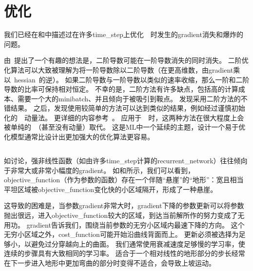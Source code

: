 \section{优化}
\label{sec:optimization_for_long_term_dependencies}
我们已经在和中描述过在许多\gls{time_step}上优化~~时发生的\gls{gradient}消失和爆炸的问题。

由~\cite{Martens+Sutskever-ICML2011}提出了一个有趣的想法是，二阶导数可能在一阶导数消失的同时消失。
二阶优化算法可以大致被理解为将一阶导数除以二阶导数（在更高维数，由\gls{gradient}乘以~\gls{hessian}~的逆）。
如果二阶导数与一阶导数以类似的速率收缩，那么一阶和二阶导数的比率可保持相对恒定。
不幸的是，二阶方法有许多缺点，包括高的计算成本、需要一个大的\gls{minibatch}、并且倾向于被吸引到鞍点。
\cite{Martens+Sutskever-ICML2011}发现采用二阶方法的不错结果。
之后，\cite{sutskeverimportance}发现使用较简单的方法可以达到类似的结果，例如经过谨慎初始化的~~动量法。
更详细的内容参考~\cite{Sutskever-thesis2012}。
应用于~~时，这两种方法在很大程度上会被单纯的~（甚至没有动量）取代。
这是\gls{ML}中一个延续的主题，设计一个易于优化模型通常比设计出更加强大的优化算法更容易。


\subsection{}
\label{sec:clipping_gradients}
如讨论，强非线性函数（如由许多\gls{time_step}计算的\gls{recurrent_network}）往往倾向于非常大或非常小幅度的\gls{gradient}。
如和所示，我们可以看到，\gls{objective_function}（作为参数的函数）存在一个伴随``悬崖''的``地形''：宽且相当平坦区域被\gls{objective_function}变化快的小区域隔开，形成了一种悬崖。

这导致的困难是，当参数\gls{gradient}非常大时，\gls{gradient}下降的参数更新可以将参数抛出很远，进入\gls{objective_function}较大的区域，到达当前解所作的努力变成了无用功。
\gls{gradient}告诉我们，围绕当前参数的无穷小区域内最速下降的方向。
这个无穷小区域之外，\gls{cost_function}可能开始沿曲线背面而上。
更新必须被选择为足够小，以避免过分穿越向上的曲面。
我们通常使用衰减速度足够慢的学习率，使连续的步骤具有大致相同的学习率。
适合于一个相对线性的地形部分的步长经常在下一步进入地形中更加弯曲的部分时变得不适合，会导致上坡运动。

